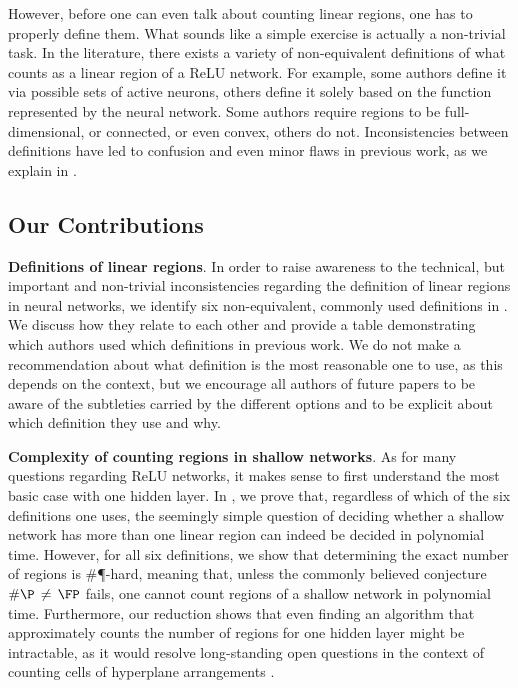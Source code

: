 \documentclass{article}
\renewcommand{\paragraph}[1]{\textbf{#1}.}
\begin{document}
However, before one can even talk about counting linear regions, one has to properly define them. What sounds like a simple exercise is actually a non-trivial task. In the literature, there exists a variety of non-equivalent definitions of what counts as a linear region of a ReLU network. For example, some authors define it via possible sets of active neurons, others define it solely based on the function represented by the neural network. Some authors require regions to be full-dimensional, or connected, or even convex, others do not.
Inconsistencies between definitions have led to confusion and even minor flaws in previous work, as we explain in .

\subsection{Our Contributions}\label{sec:contribution}

\paragraph{Definitions of linear regions}
In order to raise awareness to the technical, but important and non-trivial inconsistencies regarding the definition of linear regions in neural networks, we identify six non-equivalent, commonly used definitions in . We discuss how they relate to each other and provide a table demonstrating which authors used which definitions in previous work. We do not make a recommendation about what definition is the most reasonable one to use, as this depends on the context, but we encourage all authors of future papers to be aware of the subtleties carried by the different options and to be explicit about which definition they use and why. 

\paragraph{Complexity of counting regions in shallow networks} As for many questions regarding ReLU networks, it makes sense to first understand the most basic case with one hidden layer. In , we prove that, regardless of which of the six definitions one uses, the seemingly simple question of deciding whether a shallow network has more than one linear region can indeed be decided in polynomial time. 
However, for all six definitions, we show that determining the exact number of regions is \#\P-hard, meaning that, unless the commonly believed conjecture $\#\P\,\neq\,\FP$ fails, one cannot count regions of a shallow network in polynomial time. 
Furthermore, our reduction shows that even finding an algorithm that approximately counts the number of regions for one hidden layer might be intractable, as it would resolve long-standing open questions in the context of counting cells of hyperplane arrangements \citep{linial1986hard}.
\end{document}
